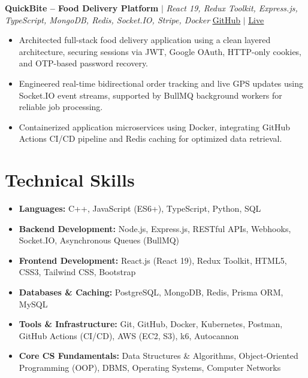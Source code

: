 \documentclass[a4paper,10pt]{article}
\begin{document}
\vspace{1.5pt}

\noindent
\textbf{QuickBite -- Food Delivery Platform} $|$ \textit{React 19, Redux Toolkit, Express.js, TypeScript, MongoDB, Redis, Socket.IO, Stripe, Docker} \hfill \href{https://github.com/ishanpanwar051}{\underline{GitHub}} $|$ \href{https://github.com/ishanpanwar051}{\underline{Live}}
\begin{itemize}[leftmargin=*, itemsep=1.5pt, parsep=0pt, topsep=1.5pt, partopsep=0pt]
    \item Architected full-stack food delivery application using a clean layered architecture, securing sessions via JWT, Google OAuth, HTTP-only cookies, and OTP-based password recovery.
    \item Engineered real-time bidirectional order tracking and live GPS updates using Socket.IO event streams, supported by BullMQ background workers for reliable job processing.
    \item Containerized application microservices using Docker, integrating GitHub Actions CI/CD pipeline and Redis caching for optimized data retrieval.
\end{itemize}

\vspace{-3pt}

\section{Technical Skills}
\begin{itemize}[leftmargin=*, label={}, itemsep=1.5pt, parsep=0pt, topsep=1.5pt, partopsep=0pt]
    \item \textbf{Languages:} C++, JavaScript (ES6+), TypeScript, Python, SQL
    \item \textbf{Backend Development:} Node.js, Express.js, RESTful APIs, Webhooks, Socket.IO, Asynchronous Queues (BullMQ)
    \item \textbf{Frontend Development:} React.js (React 19), Redux Toolkit, HTML5, CSS3, Tailwind CSS, Bootstrap
    \item \textbf{Databases \& Caching:} PostgreSQL, MongoDB, Redis, Prisma ORM, MySQL
    \item \textbf{Tools \& Infrastructure:} Git, GitHub, Docker, Kubernetes, Postman, GitHub Actions (CI/CD), AWS (EC2, S3), k6, Autocannon
    \item \textbf{Core CS Fundamentals:} Data Structures \& Algorithms, Object-Oriented Programming (OOP), DBMS, Operating Systems, Computer Networks
\end{itemize}
\end{document}

